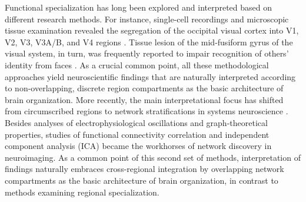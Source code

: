 \documentclass{article}
\begin{document}
Functional specialization has long been
explored and interpreted based on different research methods.
%
For instance,
single-cell recordings and microscopic tissue examination
revealed the
segregation of the occipital visual cortex into V1, V2, V3, V3A/B, and V4
regions
\cite{hubel1962receptive, zeki1978functional}.
Tissue lesion of the mid-fusiform gyrus of the visual system,
in turn,
was frequently reported to impair
recognition of others' identity from faces
\cite{iaria2008contrib}.
%
As a crucial common point,
all these methodological approaches
yield neuroscientific findings
that are naturally interpreted according to
non-overlapping, discrete region compartments
as the basic architecture of brain organization.
More recently,
the main interpretational focus has shifted
from circumscribed regions to network stratifications
in systems neuroscience \cite{yuste2015}.
%
Besides analyses of
electrophysiological oscillations
and
graph-theoretical properties,
studies of
functional connectivity correlation \cite{buckner2013opportunities} and
independent component analysis (ICA) \cite{beckmann2005}
became the workhorses of network discovery
in neuroimaging.
%
As a common point of this second set of methods,
interpretation of findings naturally embraces
cross-regional integration by
overlapping network compartments
as the basic architecture of brain organization,
in contrast to methods examining regional specialization.
\end{document}
